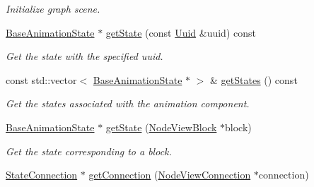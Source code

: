\begin{Indent}
\begin{DoxyCompactItemize}
\begin{DoxyCompactList}\small\item\em Initialize graph scene. \end{DoxyCompactList}\item 
\mbox{\label{classrev_1_1_view_1_1_animation_node_widget_a1240c7430e45784fc9630d47f8bdde92}} 
\mbox{\hyperlink{classrev_1_1_base_animation_state}{Base\+Animation\+State}} $\ast$ \mbox{\hyperlink{classrev_1_1_view_1_1_animation_node_widget_a1240c7430e45784fc9630d47f8bdde92}{get\+State}} (const \mbox{\hyperlink{classrev_1_1_uuid}{Uuid}} \&uuid) const
\begin{DoxyCompactList}\small\item\em Get the state with the specified uuid. \end{DoxyCompactList}\item 
\mbox{\label{classrev_1_1_view_1_1_animation_node_widget_a2fce6b498e72996872f5c6f05facb58a}} 
const std\+::vector$<$ \mbox{\hyperlink{classrev_1_1_base_animation_state}{Base\+Animation\+State}} $\ast$ $>$ \& \mbox{\hyperlink{classrev_1_1_view_1_1_animation_node_widget_a2fce6b498e72996872f5c6f05facb58a}{get\+States}} () const
\begin{DoxyCompactList}\small\item\em Get the states associated with the animation component. \end{DoxyCompactList}\item 
\mbox{\label{classrev_1_1_view_1_1_animation_node_widget_a4bfc72187decf8527d9db76f817f4cf7}} 
\mbox{\hyperlink{classrev_1_1_base_animation_state}{Base\+Animation\+State}} $\ast$ \mbox{\hyperlink{classrev_1_1_view_1_1_animation_node_widget_a4bfc72187decf8527d9db76f817f4cf7}{get\+State}} (\mbox{\hyperlink{classrev_1_1_view_1_1_node_view_block}{Node\+View\+Block}} $\ast$block)
\begin{DoxyCompactList}\small\item\em Get the state corresponding to a block. \end{DoxyCompactList}\item 
\mbox{\label{classrev_1_1_view_1_1_animation_node_widget_a2b2b79719f94c51de89f4027e1bd1809}} 
\mbox{\hyperlink{classrev_1_1_state_connection}{State\+Connection}} $\ast$ \mbox{\hyperlink{classrev_1_1_view_1_1_animation_node_widget_a2b2b79719f94c51de89f4027e1bd1809}{get\+Connection}} (\mbox{\hyperlink{classrev_1_1_view_1_1_node_view_connection}{Node\+View\+Connection}} $\ast$connection)

\end{DoxyCompactItemize}
\end{Indent}

